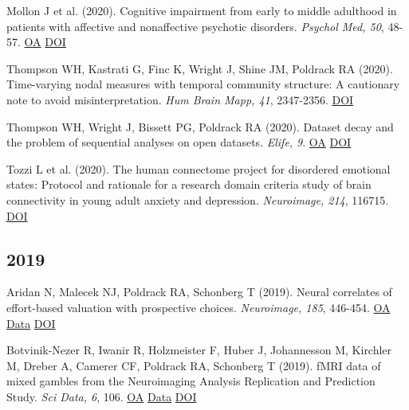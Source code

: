 Mollon J et al. (2020). Cognitive impairment from early to middle adulthood in patients with affective and nonaffective psychotic disorders. \textit{Psychol Med, 50}, 48-57. \href{https://www.ncbi.nlm.nih.gov/pmc/articles/PMC7086288}{OA} \href{http://dx.doi.org/10.1017/s0033291718003938}{DOI} \vspace{2mm}

Thompson WH, Kastrati G, Finc K, Wright J, Shine JM, Poldrack RA (2020). Time-varying nodal measures with temporal community structure: A cautionary note to avoid misinterpretation. \textit{Hum Brain Mapp, 41}, 2347-2356. \href{http://dx.doi.org/10.1002/hbm.24950}{DOI} \vspace{2mm}

Thompson WH, Wright J, Bissett PG, Poldrack RA (2020). Dataset decay and the problem of sequential analyses on open datasets. \textit{Elife, 9}. \href{https://www.ncbi.nlm.nih.gov/pmc/articles/PMC7237204}{OA} \href{http://dx.doi.org/10.7554/elife.53498}{DOI} \vspace{2mm}

Tozzi L et al. (2020). The human connectome project for disordered emotional states: Protocol and rationale for a research domain criteria study of brain connectivity in young adult anxiety and depression. \textit{Neuroimage, 214}, 116715. \href{http://dx.doi.org/10.1016/j.neuroimage.2020.116715}{DOI} \vspace{2mm}

\subsection*{2019}

Aridan N, Malecek NJ, Poldrack RA, Schonberg T (2019). Neural correlates of effort-based valuation with prospective choices. \textit{Neuroimage, 185}, 446-454. \href{https://www.ncbi.nlm.nih.gov/pmc/articles/PMC6289638}{OA} \href{https://openneuro.org/datasets/ds001167/versions/00002}{Data} \href{http://dx.doi.org/10.1016/j.neuroimage.2018.10.051}{DOI} \vspace{2mm}

Botvinik-Nezer R, Iwanir R, Holzmeister F, Huber J, Johannesson M, Kirchler M, Dreber A, Camerer CF, Poldrack RA, Schonberg T (2019). fMRI data of mixed gambles from the Neuroimaging Analysis Replication and Prediction Study. \textit{Sci Data, 6}, 106. \href{https://www.ncbi.nlm.nih.gov/pmc/articles/PMC6602933}{OA} \href{https://openneuro.org/datasets/ds001734/versions/1.0.5}{Data} \href{http://dx.doi.org/10.1038/s41597-019-0113-7}{DOI} \vspace{2mm}

